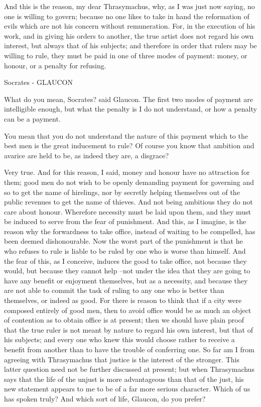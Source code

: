 And this is the reason, my dear Thrasymachus, why, as I was just now saying, no one is willing to govern; because no one likes to take in hand the reformation of evils which are not his concern without remuneration. For, in the execution of his work, and in giving his orders to another, the true artist does not regard his own interest, but always that of his subjects; and therefore in order that rulers may be willing to rule, they must be paid in one of three modes of payment: money, or honour, or a penalty for refusing.

Socrates - GLAUCON

What do you mean, Socrates? said Glaucon. The first two modes of payment are intelligible enough, but what the penalty is I do not understand, or how a penalty can be a payment.

You mean that you do not understand the nature of this payment which to the best men is the great inducement to rule? Of course you know that ambition and avarice are held to be, as indeed they are, a disgrace?

Very true.
And for this reason, I said, money and honour have no attraction for them; good men do not wish to be openly demanding payment for governing and so to get the name of hirelings, nor by secretly helping themselves out of the public revenues to get the name of thieves. And not being ambitious they do not care about honour. Wherefore necessity must be laid upon them, and they must be induced to serve from the fear of punishment. And this, as I imagine, is the reason why the forwardness to take office, instead of waiting to be compelled, has been deemed dishonourable. Now the worst part of the punishment is that he who refuses to rule is liable to be ruled by one who is worse than himself. And the fear of this, as I conceive, induces the good to take office, not because they would, but because they cannot help --not under the idea that they are going to have any benefit or enjoyment themselves, but as a necessity, and because they are not able to commit the task of ruling to any one who is better than themselves, or indeed as good. For there is reason to think that if a city were composed entirely of good men, then to avoid office would be as much an object of contention as to obtain office is at present; then we should have plain proof that the true ruler is not meant by nature to regard his own interest, but that of his subjects; and every one who knew this would choose rather to receive a benefit from another than to have the trouble of conferring one. So far am I from agreeing with Thrasymachus that justice is the interest of the stronger. This latter question need not be further discussed at present; but when Thrasymachus says that the life of the unjust is more advantageous than that of the just, his new statement appears to me to be of a far more serious character. Which of us has spoken truly? And which sort of life, Glaucon, do you prefer?


